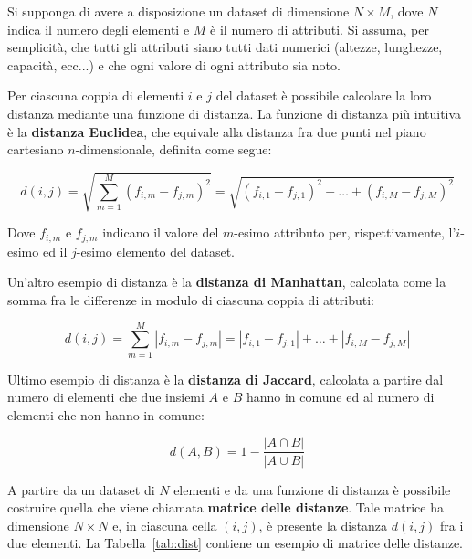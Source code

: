 \documentclass[a4paper, 12pt]{report}
\begin{document}
			Si supponga di avere a disposizione un dataset di dimensione
			$N \times M$, dove $N$ indica il numero degli elementi e $M$ è
			il numero di attributi. Si assuma, per semplicità, che tutti
			gli attributi siano tutti dati numerici (altezze, lunghezze,
			capacità, ecc...) e che ogni valore di ogni attributo sia noto.

			Per ciascuna coppia di elementi $i$ e $j$ del dataset è possibile
			calcolare la loro distanza mediante una funzione di distanza. La
			funzione di distanza più intuitiva è la \textbf{distanza Euclidea},
			che equivale alla distanza fra due punti nel piano cartesiano
			$n$-dimensionale, definita come segue:

			\begin{equation}
				d(i, j) =
				\sqrt{\sum_{m = 1}^{M} (f_{i, m} - f_{j, m})^{2}} =
				\sqrt{(f_{i, 1} - f_{j, 1})^{2} + \dots +
					(f_{i, M} - f_{j, M})^{2}}
			\end{equation}

			Dove $f_{i, m}$ e $f_{j, m}$ indicano il valore del $m$-esimo
			attributo per, rispettivamente, l'$i$-esimo ed il $j$-esimo
			elemento del dataset.

			Un'altro esempio di distanza è la \textbf{distanza di Manhattan},
			calcolata come la somma fra le differenze in modulo di ciascuna
			coppia di attributi:

			\begin{equation}
				d(i, j) =
				\sum_{m = 1}^{M} |f_{i, m} - f_{j, m}| =
				|f_{i, 1} - f_{j, 1}| + \dots +
				|f_{i, M} - f_{j, M}|
			\end{equation}

			Ultimo esempio di distanza è la \textbf{distanza di Jaccard},
			calcolata a partire dal numero di elementi che due insiemi $A$
			e $B$ hanno in comune ed al numero di elementi che non hanno
			in comune:

			\begin{equation}
				d(A, B) = 1 - \frac{|A \cap B|}{|A \cup B|}
			\end{equation}

			A partire da un dataset di $N$ elementi e da una funzione
			di distanza è possibile costruire quella che viene chiamata
			\textbf{matrice delle distanze}. Tale matrice ha dimensione
			$N \times N$ e, in ciascuna cella $(i, j)$, è presente la
			distanza $d(i, j)$ fra i due elementi. La Tabella~\ref{tab:dist}
			contiene un esempio di matrice delle distanze.
\end{document}
